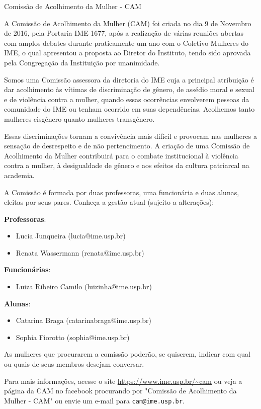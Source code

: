 \begin{subsecao}{Comissão de Acolhimento da Mulher - CAM}

A Comissão de Acolhimento da Mulher (CAM) foi criada no dia 9 de Novembro de 2016,
pela Portaria IME 1677, após a realização de várias reuniões abertas com amplos
debates durante praticamente um ano com o Coletivo Mulheres do IME, o qual 
apresentou a proposta ao Diretor do Instituto, tendo sido aprovada pela Congregação
da Instituição por unanimidade.

Somos uma Comissão assessora da diretoria do IME cuja a principal atribuição 
é dar acolhimento às vítimas de discriminação de gênero, de assédio moral e 
sexual e de violência contra a mulher, quando essas ocorrências envolverem 
pessoas da comunidade do IME ou tenham ocorrido em suas dependências. Acolhemos
tanto mulheres cisgênero quanto mulheres transgênero.

Essas discriminações tornam a convivência mais difícil e provocam nas mulheres
a sensação de desrespeito e de não pertencimento. A criação de uma Comissão de 
Acolhimento da Mulher contribuirá para o combate institucional à violência contra
a mulher, à desigualdade de gênero e aos efeitos da cultura patriarcal na academia.

A Comissão é formada por duas professoras, uma funcionária e duas alunas, 
eleitas por seus pares. Conheça a gestão atual (sujeito a alterações): 
\pagebreak

\textbf{Professoras}: 
\begin{itemize}
  \item Lucia Junqueira (lucia@ime.usp.br)
  \item Renata Wassermann (renata@ime.usp.br)
\end{itemize}

\textbf{Funcionárias}: 
\begin{itemize}
  \item Luiza Ribeiro Camilo (luizinha@ime.usp.br)
\end{itemize}

\textbf{Alunas}: 
\begin{itemize}
  \item Catarina Braga (catarinabraga@ime.usp.br)
  \item Sophia Fiorotto (sophia@ime.usp.br)
\end{itemize}

As mulheres que procurarem a comissão poderão, se quiserem, indicar com qual ou 
quais de seus membros desejam conversar.

Para mais informações, acesse o site \url{https://www.ime.usp.br/~cam} ou veja
a página da CAM no facebook procurando por "Comissão de Acolhimento da Mulher - CAM" 
 ou envie um e-mail para {\tt cam@ime.usp.br}. 


\end{subsecao}
